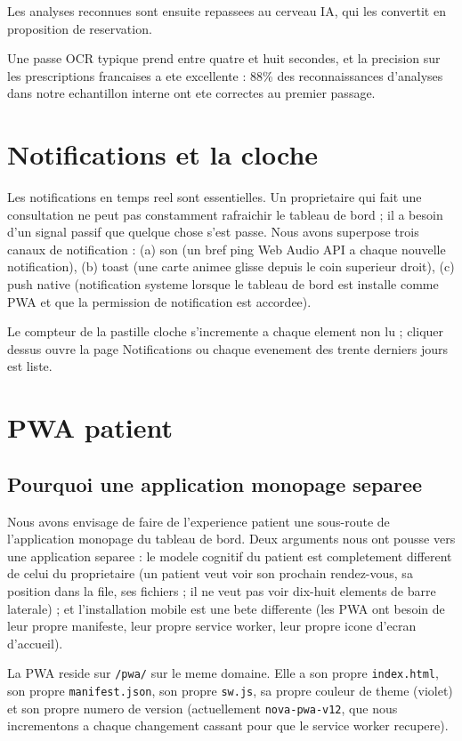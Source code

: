 Les analyses reconnues sont ensuite repassees au cerveau IA, qui les
convertit en proposition de reservation.

Une passe OCR typique prend entre quatre et huit secondes, et la
precision sur les prescriptions francaises a ete excellente : 88\%
des reconnaissances d'analyses dans notre echantillon interne ont ete
correctes au premier passage.

\section{Notifications et la cloche}
Les notifications en temps reel sont essentielles. Un proprietaire qui
fait une consultation ne peut pas constamment rafraichir le tableau de
bord ; il a besoin d'un signal passif que quelque chose s'est passe.
Nous avons superpose trois canaux de notification : (a) son (un bref
ping Web Audio API a chaque nouvelle notification), (b) toast (une
carte animee glisse depuis le coin superieur droit), (c) push native
(notification systeme lorsque le tableau de bord est installe comme
PWA et que la permission de notification est accordee).

Le compteur de la pastille cloche s'incremente a chaque element non lu ;
cliquer dessus ouvre la page Notifications ou chaque evenement des
trente derniers jours est liste.

\section{PWA patient}

\subsection{Pourquoi une application monopage separee}
Nous avons envisage de faire de l'experience patient une sous-route de
l'application monopage du tableau de bord. Deux arguments nous ont
pousse vers une application separee : le modele cognitif du patient
est completement different de celui du proprietaire (un patient veut
voir son prochain rendez-vous, sa position dans la file, ses fichiers ;
il ne veut pas voir dix-huit elements de barre laterale) ; et
l'installation mobile est une bete differente (les PWA ont besoin de
leur propre manifeste, leur propre service worker, leur propre icone
d'ecran d'accueil).

La PWA reside sur \texttt{/pwa/} sur le meme domaine. Elle a son propre
\texttt{index.html}, son propre \texttt{manifest.json}, son propre
\texttt{sw.js}, sa propre couleur de theme (violet) et son propre
numero de version (actuellement \texttt{nova-pwa-v12}, que nous
incrementons a chaque changement cassant pour que le service worker
recupere).

